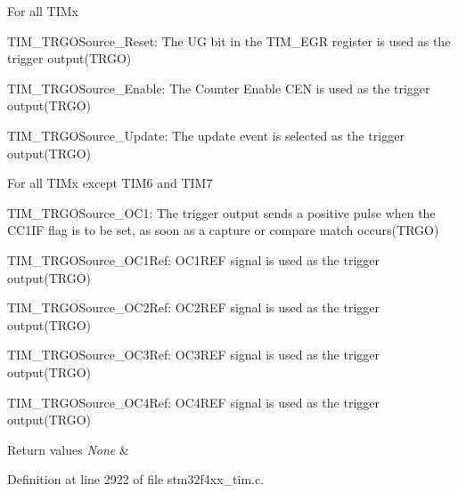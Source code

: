 \begin{DoxyItemize}
\item For all T\+I\+Mx \begin{DoxyItemize}
\item T\+I\+M\+\_\+\+T\+R\+G\+O\+Source\+\_\+\+Reset\+: The UG bit in the T\+I\+M\+\_\+\+E\+GR register is used as the trigger output(\+T\+R\+G\+O) \item T\+I\+M\+\_\+\+T\+R\+G\+O\+Source\+\_\+\+Enable\+: The Counter Enable C\+EN is used as the trigger output(\+T\+R\+G\+O) \item T\+I\+M\+\_\+\+T\+R\+G\+O\+Source\+\_\+\+Update\+: The update event is selected as the trigger output(\+T\+R\+G\+O)\end{DoxyItemize}

\item For all T\+I\+Mx except T\+I\+M6 and T\+I\+M7 \begin{DoxyItemize}
\item T\+I\+M\+\_\+\+T\+R\+G\+O\+Source\+\_\+\+O\+C1\+: The trigger output sends a positive pulse when the C\+C1\+IF flag is to be set, as soon as a capture or compare match occurs(\+T\+R\+G\+O) \item T\+I\+M\+\_\+\+T\+R\+G\+O\+Source\+\_\+\+O\+C1\+Ref\+: O\+C1\+R\+EF signal is used as the trigger output(\+T\+R\+G\+O) \item T\+I\+M\+\_\+\+T\+R\+G\+O\+Source\+\_\+\+O\+C2\+Ref\+: O\+C2\+R\+EF signal is used as the trigger output(\+T\+R\+G\+O) \item T\+I\+M\+\_\+\+T\+R\+G\+O\+Source\+\_\+\+O\+C3\+Ref\+: O\+C3\+R\+EF signal is used as the trigger output(\+T\+R\+G\+O) \item T\+I\+M\+\_\+\+T\+R\+G\+O\+Source\+\_\+\+O\+C4\+Ref\+: O\+C4\+R\+EF signal is used as the trigger output(\+T\+R\+G\+O)\end{DoxyItemize}

\begin{DoxyRetVals}{Return values}
{\em None} & \\
\hline
\end{DoxyRetVals}

\end{DoxyItemize}

Definition at line 2922 of file stm32f4xx\+\_\+tim.\+c.

\mbox{\label{group___t_i_m___group7_ga2f19ce1d90990691cf037e419ba08003}} 
